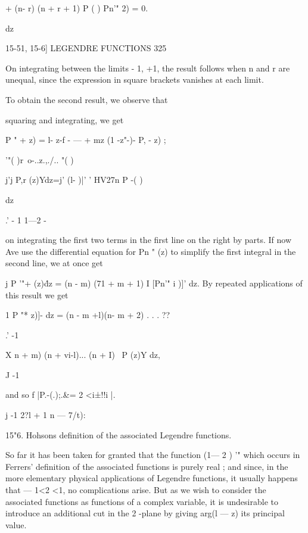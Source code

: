 {{{+ (n- r) (n + r + 1) P  ( ) Pn'"  2) = 0. 



dz 



15-51, 15-6] LEGENDRE FUNCTIONS 325 

On integrating between the limits - 1, +1, the result follows when n 
and r are unequal, since the expression in square brackets vanishes at each 
limit. 

To obtain the second result, we observe that 



squaring and integrating, we get 



P " +   z) =  l- z-f - — + mz (1 -z"-)-  P, -  z) ; 



  '"( )r\ o-..z.,./..  "( ) 



j'j P,r (z)Ydz=j'  (l- )|' '  HV27n P -( ) 



dz 



.' - 1 1—2 - 

on integrating the first two terms in the first line on the right by parts. 
If now Ave use the differential equation for Pn " (z) to simplify the first 
integral in the second line, we at once get 

j  P '"+  (z)\' dz = (n - m) (71 + m + 1) I [Pn'" i )]' dz. 
By repeated applications of this result we get 

1  P "*  z)]- dz = (n - m +l)(n- m + 2) . . . ?? 

.' -1 

X  n + m) (n + vi-l)... (n + I) \  P  (z)Y dz, 

J -1 

and so f |P.-(.);.\&= 2 <i±!!i |. 

j -1 2?l + 1  n — 7/t): 

15"6. Hohsons definition of the associated Legendre functions. 

So far it has been taken for granted that the function (1— 2 ) '" which 
occurs in Ferrers' definition of the associated functions is purely real ; and 
since, in the more elementary physical applications of Legendre functions, it 
usually happens that — 1<2 <1, no complications arise. But as we wish 
to consider the associated functions as functions of a complex variable, it is 
undesirable to introduce an additional cut in the 2 -plane by giving arg(l — z) 
its principal value. 

}}}
